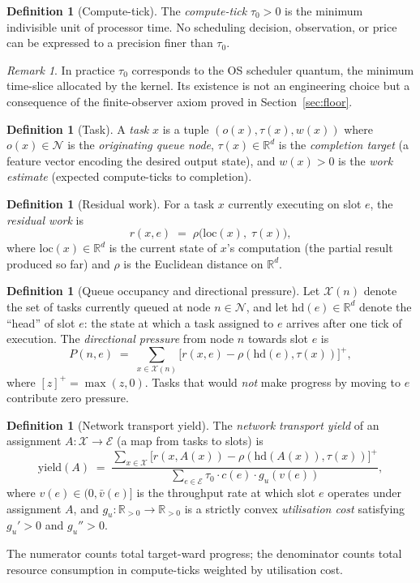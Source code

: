 \documentclass[11pt,twocolumn,a4paper]{article}
\theoremstyle{plain}
\theoremstyle{definition}
\newtheorem{definition}[theorem]{Definition}
\theoremstyle{remark}
\newtheorem{remark}[theorem]{Remark}
\newcommand{\N}{\mathcal{N}}
\newcommand{\E}{\mathcal{E}}
\newcommand{\X}{\mathcal{X}}
\newcommand{\R}{\mathbb{R}}
\newcommand{\tick}{\tau_0}
\newcommand{\yield}{\mathrm{yield}}
\newcommand{\pres}{P}
\begin{document}
\begin{definition}[Compute-tick]
\label{def:tick}
The \emph{compute-tick} $\tick > 0$ is the minimum indivisible unit of processor time. No scheduling decision, observation, or price can be expressed to a precision finer than $\tick$.
\end{definition}

\begin{remark}
In practice $\tick$ corresponds to the OS scheduler quantum, the minimum time-slice allocated by the kernel. Its existence is not an engineering choice but a consequence of the finite-observer axiom proved in Section~\ref{sec:floor}.
\end{remark}

\begin{definition}[Task]
\label{def:task}
A \emph{task} $x$ is a tuple $(o(x), \tau(x), w(x))$ where $o(x) \in \N$ is the \emph{originating queue node}, $\tau(x) \in \R^d$ is the \emph{completion target} (a feature vector encoding the desired output state), and $w(x) > 0$ is the \emph{work estimate} (expected compute-ticks to completion).
\end{definition}

\begin{definition}[Residual work]
\label{def:residual}
For a task $x$ currently executing on slot $e$, the \emph{residual work} is
\[
  r(x, e) \;=\; \rho\bigl(\mathrm{loc}(x),\; \tau(x)\bigr),
\]
where $\mathrm{loc}(x) \in \R^d$ is the current state of $x$'s computation (the partial result produced so far) and $\rho$ is the Euclidean distance on $\R^d$.
\end{definition}

\begin{definition}[Queue occupancy and directional pressure]
\label{def:pressure}
Let $\X(n)$ denote the set of tasks currently queued at node $n \in \N$, and let $\mathrm{hd}(e) \in \R^d$ denote the ``head'' of slot $e$: the state at which a task assigned to $e$ arrives after one tick of execution. The \emph{directional pressure} from node $n$ towards slot $e$ is
\[
  \pres(n, e) \;=\; \sum_{x \in \X(n)} \bigl[r(x, e) - \rho(\mathrm{hd}(e), \tau(x))\bigr]^{+},
\]
where $[z]^+ = \max(z, 0)$. Tasks that would \emph{not} make progress by moving to $e$ contribute zero pressure.
\end{definition}

\begin{definition}[Network transport yield]
\label{def:yield}
The \emph{network transport yield} of an assignment $A : \X \to \E$ (a map from tasks to slots) is
\[
  \yield(A) \;=\; \frac{\displaystyle\sum_{x \in \X} \bigl[r(x, A(x)) - \rho(\mathrm{hd}(A(x)), \tau(x))\bigr]^{+}}
                        {\displaystyle\sum_{e \in \E} \tick \cdot c(e) \cdot g_u(v(e))},
\]
where $v(e) \in (0, \bar{v}(e)]$ is the throughput rate at which slot $e$ operates under assignment $A$, and $g_u : \R_{>0} \to \R_{>0}$ is a strictly convex \emph{utilisation cost} satisfying $g_u' > 0$ and $g_u'' > 0$.

\noindent
The numerator counts total target-ward progress; the denominator counts total resource consumption in compute-ticks weighted by utilisation cost.
\end{definition}
\end{document}
